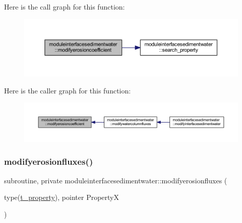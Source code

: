 Here is the call graph for this function\+:\nopagebreak
\begin{figure}[H]
\begin{center}
\leavevmode
\includegraphics[width=350pt]{namespacemoduleinterfacesedimentwater_aae597d2dbf7b3014156d4fb4815b25bb_cgraph}
\end{center}
\end{figure}
Here is the caller graph for this function\+:\nopagebreak
\begin{figure}[H]
\begin{center}
\leavevmode
\includegraphics[width=350pt]{namespacemoduleinterfacesedimentwater_aae597d2dbf7b3014156d4fb4815b25bb_icgraph}
\end{center}
\end{figure}
\mbox{\label{namespacemoduleinterfacesedimentwater_a26bb67acd49cf811c778aa020cef0f2a}} 
\subsubsection{\texorpdfstring{modifyerosionfluxes()}{modifyerosionfluxes()}}
{\footnotesize\ttfamily subroutine, private moduleinterfacesedimentwater\+::modifyerosionfluxes (\begin{DoxyParamCaption}\item[{type(\mbox{\hyperlink{structmoduleinterfacesedimentwater_1_1t__property}{t\+\_\+property}}), pointer}]{PropertyX }\end{DoxyParamCaption})\hspace{0.3cm}{\ttfamily [private]}}

